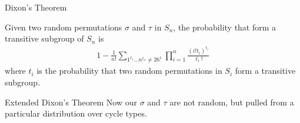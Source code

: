 \documentclass[hyphens,aspectratio=169]{beamer}
\begin{document}
\begin{frame}[fragile]{Dixon's Theorem}
	\begin{theorem}
		Given two random permutations $\sigma$ and $\tau$ in $S_n$, the
		probability that form a transitive subgroup of $S_n$ is
		\begin{align*}
			1-\frac{1}{n!}\sum_{1^{\ell_1}\dots n^{\ell_n} \ne 26^1}\prod_{i=1}^n{\frac{(i!t_{i})^{\ell_i}}{\ell_i!}}
		\end{align*}
		where $t_i$ is the probability that two random permutations in
		$S_i$ form a transitive subgroup.
	\end{theorem}

\end{frame}

\begin{frame}[fragile]{Extended Dixon's Theorem}
	\large
	Now our $\sigma$ and $\tau$ are not random, but pulled from a particular distribution over cycle types.
\end{frame}
\end{document}
